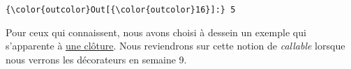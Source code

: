 \begin{Verbatim}[commandchars=\\\{\}]
{\color{outcolor}Out[{\color{outcolor}16}]:} 5
\end{Verbatim}
            
    Pour ceux qui connaissent, nous avons choisi à dessein un exemple qui
s'apparente à
\href{http://en.wikipedia.org/wiki/Closure_\%28computer_programming\%29}{une
clôture}. Nous reviendrons sur cette notion de \emph{callable} lorsque
nous verrons les décorateurs en semaine 9.


    
    
    
